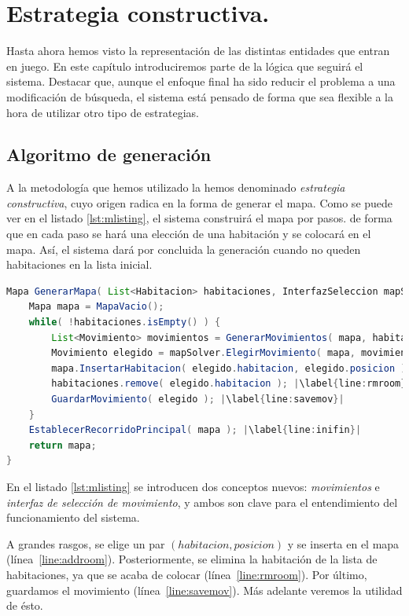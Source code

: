 \chapter{Estrategia constructiva.}\label{cap:capitulo4}

Hasta ahora hemos visto la representación de las distintas entidades que entran en juego. En este capítulo introduciremos parte de la lógica que seguirá el sistema. Destacar que, aunque el enfoque final ha sido reducir el problema a una modificación de búsqueda, el sistema está pensado de forma que sea flexible a la hora de utilizar otro tipo de estrategias.


\section{Algoritmo de generación}
A la metodología que hemos utilizado la hemos denominado \emph{estrategia constructiva}, cuyo origen radica en la forma de generar el mapa. Como se puede ver en el listado \ref{lst:mlisting}, el sistema construirá el mapa por pasos. de forma que en cada paso se hará una elección de una habitación y se colocará en el mapa. Así, el sistema dará por concluida la generación cuando no queden habitaciones en la lista inicial.

\begin{lstlisting}[caption={Algoritmo constructivo para generar mapas},label={lst:mlisting},language=Java,escapechar=|]
Mapa GenerarMapa( List<Habitacion> habitaciones, InterfazSeleccion mapSolver ) {
	Mapa mapa = MapaVacio();
	while( !habitaciones.isEmpty() ) {
		List<Movimiento> movimientos = GenerarMovimientos( mapa, habitaciones ); |\label{line:movgen}|
		Movimiento elegido = mapSolver.ElegirMovimiento( mapa, movimientos ); |\label{line:ifaceselect}|
		mapa.InsertarHabitacion( elegido.habitacion, elegido.posicion ); |\label{line:addroom}|
		habitaciones.remove( elegido.habitacion ); |\label{line:rmroom}|
		GuardarMovimiento( elegido ); |\label{line:savemov}|
	}
	EstablecerRecorridoPrincipal( mapa ); |\label{line:inifin}|
	return mapa;
}
\end{lstlisting}

En el listado \ref{lst:mlisting} se introducen dos conceptos nuevos: \emph{movimientos} e \emph{interfaz de selección de movimiento}, y ambos son clave para el entendimiento del funcionamiento del sistema.

A grandes rasgos, se elige un par $(habitacion, posicion)$ y se inserta en el mapa (línea~\ref{line:addroom}). Posteriormente, se elimina la habitación de la lista de habitaciones, ya que se acaba de colocar (línea~\ref{line:rmroom}). Por último, guardamos el movimiento (línea~\ref{line:savemov}). Más adelante veremos la utilidad de ésto.

